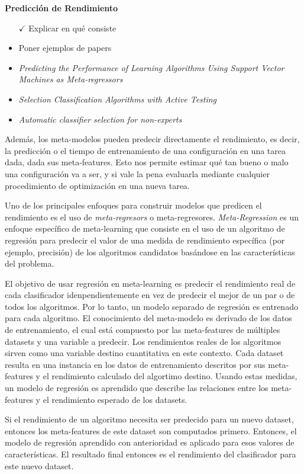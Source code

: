 \textbf{Predicción de Rendimiento}

\begin{itemize}
	\item[$\checkmark$] Explicar en qué consiste
	\item Poner ejemplos de papers
	\item \textit{Predicting the Performance of Learning Algorithms Using Support Vector Machines as Meta-regressors}
	\item \textit{Selection Classification Algorithms with Active Testing}
	\item \textit{Automatic classifier selection for non-experts}
\end{itemize}

\quad

Además, los meta-modelos pueden predecir directamente el rendimiento, es decir, la predicción o el tiempo de entrenamiento de una configuración en una tarea dada, dada sus meta-features. Esto nos permite estimar qué tan bueno o malo una configuración va a ser, y si vale la pena evaluarla mediante cualquier procedimiento de optimización en una nueva tarea.

Uno de los principales enfoques para construir modelos que predicen el rendimiento es el uso de \textit{meta-regresors} o meta-regresores. \textit{Meta-Regression} es un enfoque específico de meta-learning que consiste en el uso de un algoritmo de regresión para predecir el valor de una medida de rendimiento específica (por ejemplo, precisión) de los algoritmos candidatos basándose en las características del problema. 

El objetivo de usar regresión en meta-learning es predecir el rendimiento real de cada clasificador idenpendientemente en vez de predecir el mejor de un par o de todos los algoritmos. Por lo tanto, un modelo separado de regresión es entrenado para cada algoritmo. El conocimiento del meta-modelo es derivado de los datos de entrenamiento, el cual está compuesto por las meta-features de múltiples datasets y una variable a predecir. Los rendimientos reales de los algoritmos sirven como una variable destino cuantitativa en este contexto. Cada dataset resulta en una instancia en los datos de entrenamiento descritos por sus meta-features y el rendimiento calculado del algortimo destino. Usando estas medidas, un modelo de regresión es aprendido que describe las relaciones entre los meta-features y el rendimiento esperado de los datasets.

Si el rendimiento de un algoritmo necesita ser predecido para un nuevo dataset, entonces los meta-features de este dataset son computados primero. Entonces, el modelo de regresión aprendido con anterioridad es aplicado para esos valores de características. El resultado final entonces es el rendimiento del clasificador para este nuevo dataset.

